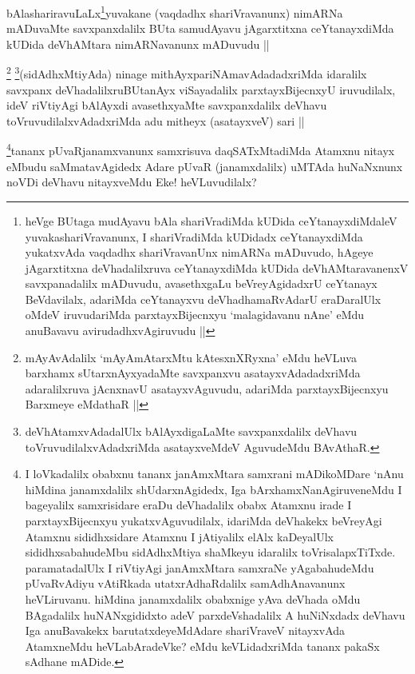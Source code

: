 \begin{artha}
bAlashariravuLaLx\footnote[2]{heVge BUtaga mudAyavu bAla shariVradiMda kUDida ceYtanayxdiMdaleV yuvakashariVravanunx, I shariVradiMda kUDidadx ceYtanayxdiMda yukatxvAda vaqdadhx shariVravanUnx nimARNa mADuvudo, hAgeye jAgarxtitxna deVhadalilxruva ceYtanayxdiMda kUDida deVhAMtaravanenxV savxpanadalilx mADuvudu, avasethxgaLu beVreyAgidadxrU ceYtanayx BeVdavilalx, adariMda ceYtanayxvu deVhadhamaRvAdarU eraDaralUlx oMdeV iruvudariMda parxtayxBijecnxyu `malagidavanu nAne' eMdu anuBavavu avirudadhxvAgiruvudu ||}yuvakane (vaqdadhx shariVravanunx) nimARNa mADuvaMte savxpanxdalilx BUta samudAyavu jAgarxtitxna ceYtanayxdiMda kUDida deVhAMtara nimARNavanunx mADuvudu ||
\end{artha}

\begin{artha}
\footnote[1]{mAyAvAdalilx `mAyAmAtarxMtu kAtesxnXRyxna' eMdu heVLuva barxhamx sUtarxnAyxyadaMte savxpanxvu asatayxvAdadadxriMda adaralilxruva jAcnxnavU asatayxvAguvudu, adariMda parxtayxBijecnxyu Barxmeye eMdathaR ||}
\footnote[2]{deVhAtamxvAdadalUlx bAlAyxdigaLaMte savxpanxdalilx deVhavu toVruvudilalxvAdadxriMda asatayxveMdeV AguvudeMdu BAvAthaR.}(sidAdhxMtiyAda) ninage mithAyxpariNAmavAdadadxriMda idaralilx savxpanx deVhadalilxruBUtanAyx viSayadalilx parxtayxBijecnxyU iruvudilalx, ideV riVtiyAgi bAlAyxdi avasethxyaMte savxpanxdalilx deVhavu toVruvudilalxvAdadxriMda adu mitheyx (asatayxveV) sari || 
\end{artha}

\begin{artha}
\footnote[3]{I loVkadalilx obabxnu tananx janAmxMtara samxrani mADikoMDare `nAnu hiMdina janamxdalilx shUdarxnAgidedx, Iga bArxhamxNanAgiruveneMdu I bageyalilx samxrisidare eraDu deVhadalilx obabx Atamxnu irade I parxtayxBijecnxyu yukatxvAguvudilalx, idariMda deVhakekx beVreyAgi Atamxnu sididhxsidare Atamxnu I jAtiyalilx elAlx kaDeyalUlx sididhxsabahudeMbu sidAdhxMtiya shaMkeyu idaralilx toVrisalapxTiTxde. paramatadalUlx I riVtiyAgi janAmxMtara samxraNe yAgabahudeMdu pUvaRvAdiyu vAtiRkada utatxrAdhaRdalilx samAdhAnavanunx heVLiruvanu. hiMdina janamxdalilx obabxnige yAva deVhada oMdu BAgadalilx huNANxgididxto adeV parxdeVshadalilx A huNiNxdadx deVhavu Iga anuBavakekx barutatxdeyeMdAdare shariVraveV nitayxvAda AtamxneMdu heVLabAradeVke? eMdu keVLidadxriMda tananx pakaSx sAdhane mADide.}tananx pUvaRjanamxvanunx samxrisuva daqSATxMtadiMda Atamxnu nitayx eMbudu saMmatavAgidedx Adare pUvaR (janamxdalilx) uMTAda huNaNxnunx noVDi deVhavu nitayxveMdu Eke! heVLuvudilalx?
\end{artha}

